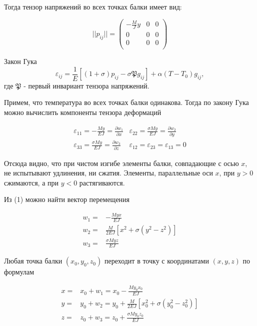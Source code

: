 \noindent Тогда тензор напряжений во всех точках балки имеет вид:

\begin{equation*}
||p_{ij}|| = \left(
\begin{array}{ccc}
-\frac{M}{J}y & 0 & 0 \\
0 & 0 & 0 \\
0 & 0 & 0 \\
\end{array}
\right)
\end{equation*}

Закон Гука
$$ \varepsilon_{ij} = \frac{1}{E} \left[ (1+\sigma)p_{ij} - \sigma \mathfrak{P} g_{ij} \right] + \alpha (T-T_0)g_{ij} ,$$
где $\mathfrak{P}$ - первый инвариант тензора напряжений.

Примем, что температура во всех точках балки одинакова. Тогда по закону Гука можно вычислить компоненты тензора деформаций

\begin{equation}
\begin{array}{cc}
\varepsilon_{11} = -\frac{My}{EJ} = \frac{\partial w_1}{\partial x} & \varepsilon_{22} = \frac{\sigma My}{EJ} = \frac{\partial w_2}{\partial y} \\
\varepsilon_{33} = \frac{\sigma My}{EJ} = \frac{\partial w_3}{\partial z} & \varepsilon_{12} = \varepsilon_{23} = \varepsilon_{13} = 0
\end{array}
\end{equation}

Отсюда видно, что при чистом изгибе элементы балки, совпадающие с осью $x$, не испытывают удлинения, ни сжатия. Элементы, параллельные оси $x$, при $y>0$ сжимаются, а при $y<0$ растягиваются.

Из (1) можно найти вектор перемещения

\begin{equation}
\begin{array}{cc}
w_1 =& - \frac{Myx}{EJ} \\
w_2 =& \frac{M}{2EJ}[x^2 + \sigma (y^2 - z^2)] \\
w_3 =& \frac{\sigma Myz}{EJ}
\end{array}
\end{equation}


Любая точка балки $(x_0, y_0, z_0)$ переходит в точку с координатами $(x, y, z)$ по формулам

\begin{equation}
\begin{array}{cc}
x =& x_0 + w_1 = x_0 - \frac{My_0x_0}{EJ} \\
y =& y_0 + w_2 = y_0 + \frac{M}{2EJ}[x_0^2 + \sigma (y_0^2 - z_0^2)] \\
z =& z_0 + w_3 = z_0 + \frac{\sigma My_0z_0}{EJ}\\
\end{array}
\end{equation}

